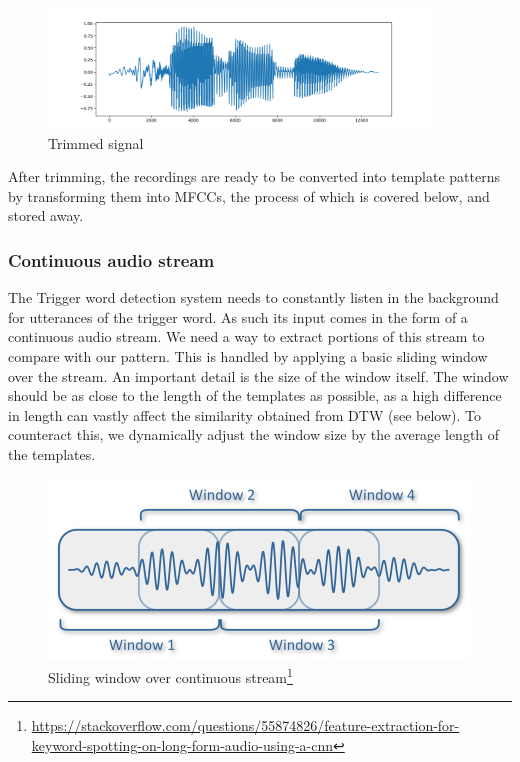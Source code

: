     \begin{figure}[h]
        \centering
        \includegraphics[width = 0.9\textwidth]{img/Figure_3.png}
        \caption{Trimmed signal}
        \label{fig:trimmed}
    \end{figure}
    
    After trimming, the recordings are ready to be converted into template patterns by transforming them into MFCCs, the process of which is covered below, and stored away. 
    
    \subsubsection{Continuous audio stream}
    The Trigger word detection system needs to constantly listen in the background for utterances of the trigger word. As such its input comes in the form of a continuous audio stream. We need a way to extract portions of this stream to compare with our pattern. This is handled by applying a basic sliding window over the stream. An important detail is the size of the window itself. The window should be as close to the length  of the templates as possible, as a high difference in length can vastly affect the similarity obtained from DTW (see below). To counteract this, we dynamically adjust the window size by the average length of the templates. 

    \begin{figure}[h]
        \centering
        \includegraphics{img/window.png}
        \caption{Sliding window over continuous stream\footnote{\url{https://stackoverflow.com/questions/55874826/feature-extraction-for-keyword-spotting-on-long-form-audio-using-a-cnn}}}
        \label{fig:window}
    \end{figure}


